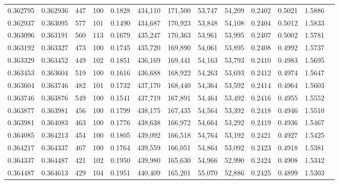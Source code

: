 \begin{tabular}{rrrrrrrrrrrrr}
0.362795 & 0.362936 &   447 & 100 &                                     0.1828 & 434,110 & 171,500 &  53,747 &  54,209 & 0.2402 & 0.5021 & 1.5886 \\
0.362937 & 0.363095 &   577 & 101 &                                     0.1490 & 434,687 & 170,923 &  53,848 &  54,108 & 0.2404 & 0.5012 & 1.5833 \\
0.363096 & 0.363191 &   560 & 113 &                                     0.1679 & 435,247 & 170,363 &  53,961 &  53,995 & 0.2407 & 0.5002 & 1.5781 \\
0.363192 & 0.363327 &   473 & 100 &                                     0.1745 & 435,720 & 169,890 &  54,061 &  53,895 & 0.2408 & 0.4992 & 1.5737 \\
0.363329 & 0.363452 &   449 & 102 &                                     0.1851 & 436,169 & 169,441 &  54,163 &  53,793 & 0.2410 & 0.4983 & 1.5695 \\
0.363453 & 0.363604 &   519 & 100 &                                     0.1616 & 436,688 & 168,922 &  54,263 &  53,693 & 0.2412 & 0.4974 & 1.5647 \\
0.363604 & 0.363746 &   482 & 101 &                                     0.1732 & 437,170 & 168,440 &  54,364 &  53,592 & 0.2414 & 0.4964 & 1.5603 \\
0.363746 & 0.363876 &   549 & 100 &                                     0.1541 & 437,719 & 167,891 &  54,464 &  53,492 & 0.2416 & 0.4955 & 1.5552 \\
0.363877 & 0.363981 &   456 & 100 &                                     0.1799 & 438,175 & 167,435 &  54,564 &  53,392 & 0.2418 & 0.4946 & 1.5510 \\
0.363981 & 0.364083 &   463 & 100 &                                     0.1776 & 438,638 & 166,972 &  54,664 &  53,292 & 0.2419 & 0.4936 & 1.5467 \\
0.364085 & 0.364213 &   454 & 100 &                                     0.1805 & 439,092 & 166,518 &  54,764 &  53,192 & 0.2421 & 0.4927 & 1.5425 \\
0.364217 & 0.364337 &   467 & 100 &                                     0.1764 & 439,559 & 166,051 &  54,864 &  53,092 & 0.2423 & 0.4918 & 1.5381 \\
0.364337 & 0.364487 &   421 & 102 &                                     0.1950 & 439,980 & 165,630 &  54,966 &  52,990 & 0.2424 & 0.4908 & 1.5342 \\
0.364487 & 0.364613 &   429 & 104 &                                     0.1951 & 440,409 & 165,201 &  55,070 &  52,886 & 0.2425 & 0.4899 & 1.5303 \\

\end{tabular}
